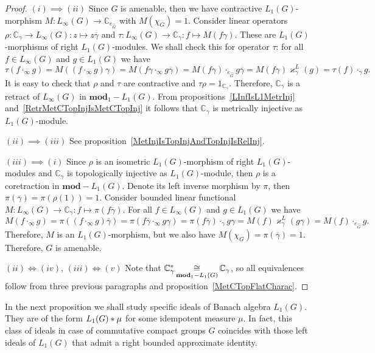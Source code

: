 \begin{proof} $(i)\implies (ii)$ Since $G$ is amenable, then we have
contractive $L_1(G)$-morphism $M:L_\infty(G)\to\mathbb{C}_{e_{\widehat{G}}}$
with $M(\chi_G)=1$. Consider linear 
operators $\rho:\mathbb{C}_\gamma\to L_\infty(G):z\mapsto z\overline{\gamma}$ 
and $\tau:L_\infty(G)\to\mathbb{C}_\gamma:f\mapsto M(f\gamma)$. These are
$L_1(G)$-morphisms of right $L_1(G)$-modules. We shall check this for operator
$\tau$: for all $f\in L_\infty(G)$ and $g\in L_1(G)$ we have
$$
\tau(f\cdot_\infty g)
=M((f\cdot_\infty g)\gamma)
=M(f\gamma\cdot_\infty g\overline{\gamma})
=M(f\gamma)\cdot_{e_{\widehat{G}}} g\overline{\gamma}
=M(f\gamma)\varkappa_\gamma^L(g)
=\tau(f)\cdot_{\gamma} g.
$$  
It is easy to check that $\rho$ and $\tau$ are contractive and
$\tau\rho=1_{\mathbb{C}_\gamma}$. Therefore, $\mathbb{C}_\gamma$ is a retract of
$L_\infty(G)$ in $\mathbf{mod}_1-L_1(G)$. From
propositions~\ref{LInfIsL1MetrInj} and~\ref{RetrMetCTopInjIsMetCTopInj} it 
follows that $\mathbb{C}_\gamma$ is metrically injective as $L_1(G)$-module.

$(ii)\implies (iii)$ See proposition~\ref{MetInjIsTopInjAndTopInjIsRelInj}.

$(iii) \implies (i)$ Since $\rho$ is an isometric $L_1(G)$-morphism of right
$L_1(G)$-modules and $\mathbb{C}_\gamma$ is topologically injective as
$L_1(G)$-module, then $\rho$ is a coretraction in $\mathbf{mod}-L_1(G)$. Denote
its left inverse morphism by $\pi$, then
$\pi(\overline{\gamma})=\pi(\rho(1))=1$. Consider bounded linear functional
$M:L_\infty(G)\to\mathbb{C}_\gamma:f\mapsto \pi(f\overline{\gamma})$. For all
$f\in L_\infty(G)$ and $g\in L_1(G)$ we have
$$
M(f\cdot_\infty g)
=\pi((f\cdot_\infty g)\overline{\gamma})
=\pi(f\overline{\gamma}\cdot_\infty g\gamma)
=\pi(f\overline{\gamma})\cdot_{\gamma} g\gamma
=M(f)\varkappa_\gamma^L(g\gamma)
=M(f)\cdot_{e_{\widehat{G}}}g.
$$
Therefore, $M$ is an $L_1(G)$-morphism, but we also have
$M(\chi_G)=\pi(\overline{\gamma})=1$. Therefore, $G$ is amenable.

$(ii) \Longleftrightarrow (iv)$, $(iii) \Longleftrightarrow (v)$ Note that
$\mathbb{C}_\gamma^*\mathop{\mathbin{\cong}}\limits_{\mathbf{mod}_1-L_1(G)}\mathbb{C}_\gamma$, so all
equivalences  follow from three previous paragraphs and
proposition~\ref{MetCTopFlatCharac}.
\end{proof}

In the next proposition we shall study specific ideals of Banach algebra
$L_1(G)$. They are of the form $L_1(G)\ast\mu$ for some idempotent measure
$\mu$. In fact, this class of ideals in case of commutative compact groups $G$
coincides with those left ideals of $L_1(G)$ that admit a right bounded
approximate identity.

